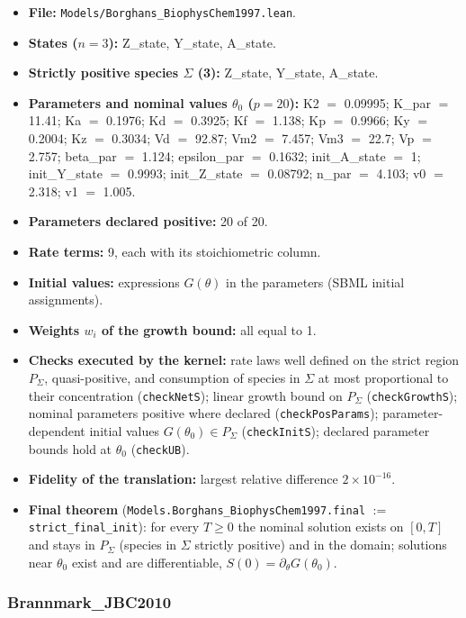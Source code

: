 \begin{itemize}\itemsep0pt\small
\item \textbf{File:} \texttt{Models/Borghans\_BiophysChem1997.lean}.
\item \textbf{States ($n=3$):} Z\_state, Y\_state, A\_state.
\item \textbf{Strictly positive species $\Sigma$ (3):} Z\_state, Y\_state, A\_state.
\item \textbf{Parameters and nominal values $\theta_0$ ($p=20$):} K2 $=$ 0.09995; K\_par $=$ 11.41; Ka $=$ 0.1976; Kd $=$ 0.3925; Kf $=$ 1.138; Kp $=$ 0.9966; Ky $=$ 0.2004; Kz $=$ 0.3034; Vd $=$ 92.87; Vm2 $=$ 7.457; Vm3 $=$ 22.7; Vp $=$ 2.757; beta\_par $=$ 1.124; epsilon\_par $=$ 0.1632; init\_A\_state $=$ 1; init\_Y\_state $=$ 0.9993; init\_Z\_state $=$ 0.08792; n\_par $=$ 4.103; v0 $=$ 2.318; v1 $=$ 1.005.
\item \textbf{Parameters declared positive:} 20 of 20.
\item \textbf{Rate terms:} 9, each with its stoichiometric column.
\item \textbf{Initial values:} expressions $G(\theta)$ in the parameters (SBML initial assignments).
\item \textbf{Weights $w_i$ of the growth bound:} all equal to 1.
\item \textbf{Checks executed by the kernel:} rate laws well defined on the strict region $P_\Sigma$, quasi-positive, and consumption of species in $\Sigma$ at most proportional to their concentration (\texttt{checkNetS}); linear growth bound on $P_\Sigma$ (\texttt{checkGrowthS}); nominal parameters positive where declared (\texttt{checkPosParams}); parameter-dependent initial values $G(\theta_0)\in P_\Sigma$ (\texttt{checkInitS}); declared parameter bounds hold at $\theta_0$ (\texttt{checkUB}).
\item \textbf{Fidelity of the translation:} largest relative difference $2\times10^{-16}$.
\item \textbf{Final theorem} (\texttt{Models.Borghans\_BiophysChem1997.final} $:=$ \texttt{strict\_final\_init}): for every $T\ge0$ the nominal solution exists on $[0,T]$ and stays in $P_\Sigma$ (species in $\Sigma$ strictly positive) and in the domain; solutions near $\theta_0$ exist and are differentiable, $S(0)=\partial_\theta G(\theta_0)$.
\end{itemize}

\subsubsection*{Brannmark\_JBC2010}

